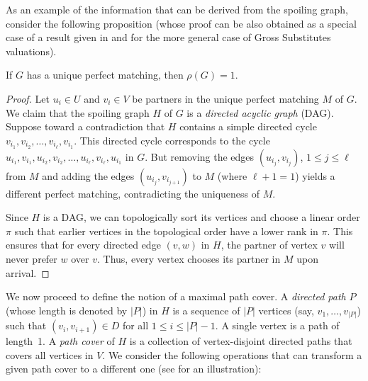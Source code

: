 \documentclass{toc}
\theoremstyle{plain}
\begin{document}
As an example of the information that can be derived from the spoiling graph, consider the following proposition (whose proof can be also obtained as a special case of a result given in \cite{Cohen-AddadEFF16} and \cite{LemeW17} for the more general case of Gross Substitutes valuations).

\begin{proposition}
	\label{prop:dag}
	If $G$ has a unique perfect matching, then $\rho(G)=1$.
\end{proposition}
\begin{proof}
	Let $u_i\in U$ and $v_i \in V$ be partners in the unique perfect matching $M$ of $G$.
	We claim that the spoiling graph $H$ of $G$ is a \emph{directed acyclic graph} (DAG).
	Suppose toward a %
contradiction that $H$ contains a simple directed cycle $v_{i_1},v_{i_2},\ldots, v_{i_\ell},v_{i_1}$.
	This directed cycle corresponds to the cycle $u_{i_1},v_{i_1},u_{i_2},v_{i_2},\ldots,u_{i_\ell},v_{i_{\ell}},u_{i_1}$ in $G$.
	But removing the edges $(u_{i_j},v_{i_j})$, $1\leq j\leq \ell$ from $M$ and adding the edges $(u_{i_j},v_{i_{j+1}})$ to $M$ (where $\ell+1=1$) yields a different perfect matching, contradicting the uniqueness of $M$.
	
	Since $H$ is a DAG, we can topologically sort its vertices and choose a linear order $\pi$ such that earlier vertices in the topological order have a lower rank in $\pi$. This ensures that for every directed edge $(v,w)$ in $H$,
%
the partner of vertex $v$  %
will never prefer $w$ over $v$. Thus, every vertex chooses its partner in $M$ upon arrival.
\end{proof}

We now proceed to define the notion of a maximal path cover.
A \emph{directed path} $P$ (whose length is denoted by $|P|$) in $H$ is a sequence of $|P|$ vertices (say, $v_1, \ldots, v_{|P|}$) such that $(v_{i}, v_{i+1}) \in D$ for all $1 \le i \le |P|-1$.  
A single vertex is a path of length~1. %
%
%
%
%
%
%
%
A \emph{path cover} of $H$ is a collection of
%
vertex-disjoint   %
directed paths that covers all vertices in $V$. We consider the following operations that can transform a given path cover to a different one (see  for an illustration):
\end{document}
